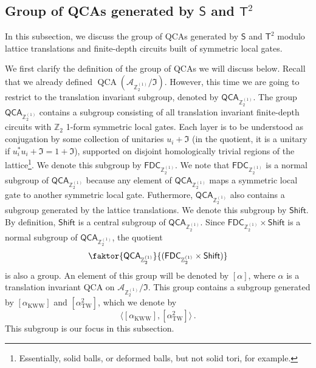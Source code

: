 \documentclass[aps,twocolumn,prx,floatfix,preprintnumbers, nofootinbib,10pt]{revtex4-2}
\numberwithin{equation}{section}
\theoremstyle{definition}
\theoremstyle{remark}
\theoremstyle{claim}
\newcommand{\aKWW}{\alpha_\text{KWW}}
\newcommand{\aTW}{\alpha_\text{TW}}
\newcommand{\Z}{{\mathbb Z}}
\newcommand{\mc}[1]{\mathcal{#1}}
\renewcommand{\sf}[1]{\mathsf{#1}}
\begin{document}
\subsection{Group of QCAs generated by $\mathsf{S}$ and $\sf{T}^2$}
\label{sec: The group of QCAs generated by D and U}
In this subsection, we discuss the group of QCAs generated by $\mathsf{S}$ and $\sf{T}^2$ modulo lattice translations and finite-depth circuits built of symmetric local gates.

We first clarify the definition of the group of QCAs we will discuss below. Recall that we already defined $\operatorname{QCA}(\mc{A}_{\Z_2^{(1)}} / \mathfrak{I})$. However, this time we are going to restrict to the translation invariant subgroup, denoted by $\mathsf{QCA}_{\mathbb{Z}_2^{(1)}}$.
The group $\mathsf{QCA}_{\mathbb{Z}_2^{(1)}}$ contains a subgroup consisting of all translation invariant finite-depth circuits with $\mathbb{Z}_2$ 1-form symmetric local gates. Each layer is to be understood as conjugation by some collection of unitaries $u_i + \mathfrak{I}$ (in the quotient, it is a unitary if $u_i^{*} u_i + \mathfrak{I} = 1 + \mathfrak{I}$), supported on disjoint homologically trivial regions of the lattice\footnote{Essentially, solid balls, or deformed balls, but not solid tori, for example.}.
We denote this subgroup by $\mathsf{FDC}_{\mathbb{Z}_2^{(1)}}$.
We note that $\mathsf{FDC}_{\mathbb{Z}_2^{(1)}}$ is a normal subgroup of $\mathsf{QCA}_{\mathbb{Z}_2^{(1)}}$ because any element of $\mathsf{QCA}_{\mathbb{Z}_2^{(1)}}$ maps a symmetric local gate to another symmetric local gate.
Futhermore, $\mathsf{QCA}_{\mathbb{Z}_2^{(1)}}$ also contains a subgroup generated by the lattice translations.
We denote this subgroup by $\mathsf{Shift}$.
By definition, $\mathsf{Shift}$ is a central subgroup of $\mathsf{QCA}_{\mathbb{Z}_2^{(1)}}$.
Since $\mathsf{FDC}_{\mathbb{Z}_2^{(1)}} \times \mathsf{Shift}$ is a normal subgroup of $\mathsf{QCA}_{\mathbb{Z}_2^{(1)}}$, the quotient
\begin{equation}
\faktor{\mathsf{QCA}_{\mathbb{Z}_2^{(1)}}}{(\mathsf{FDC}_{\mathbb{Z}_2^{(1)}} \times \mathsf{Shift})}
\end{equation}
is also a group.
An element of this group will be denoted by $[\alpha]$, where $\alpha$ is a translation invariant QCA on $\mathcal{A}_{\mathbb{Z}_2^{(1)}} / \mathfrak{I}$.
This group contains a subgroup generated by $[\aKWW]$ and $[\aTW^2]$, which we denote by
\begin{equation}
\langle [\aKWW], [\aTW^2] \rangle \,.
\end{equation}
This subgroup is our focus in this subsection.
\end{document}
